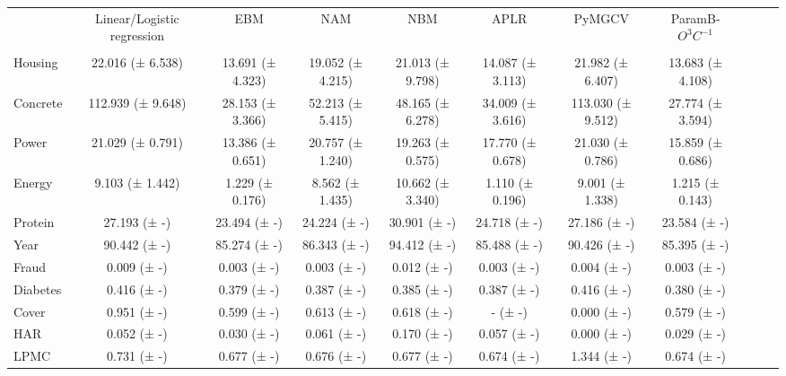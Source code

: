 \begin{tabular}{lcccccccccc}
\toprule
 & Linear/Logistic regression & EBM & NAM & NBM & APLR & PyMGCV & ParamB-$O^3C^{-1}$ \\
 &  &  &  &  &  &  &  \\
\midrule
Housing & 22.016 (± 6.538) & 13.691 (± 4.323) & 19.052 (± 4.215) & 21.013 (± 9.798) & 14.087 (± 3.113) & 21.982 (± 6.407) & 13.683 (± 4.108) \\
Concrete & 112.939 (± 9.648) & 28.153 (± 3.366) & 52.213 (± 5.415) & 48.165 (± 6.278) & 34.009 (± 3.616) & 113.030 (± 9.512) & 27.774 (± 3.594) \\
Power & 21.029 (± 0.791) & 13.386 (± 0.651) & 20.757 (± 1.240) & 19.263 (± 0.575) & 17.770 (± 0.678) & 21.030 (± 0.786) & 15.859 (± 0.686) \\
Energy & 9.103 (± 1.442) & 1.229 (± 0.176) & 8.562 (± 1.435) & 10.662 (± 3.340) & 1.110 (± 0.196) & 9.001 (± 1.338) & 1.215 (± 0.143) \\
Protein & 27.193 (± -) & 23.494 (± -) & 24.224 (± -) & 30.901 (± -) & 24.718 (± -) & 27.186 (± -) & 23.584 (± -) \\
Year & 90.442 (± -) & 85.274 (± -) & 86.343 (± -) & 94.412 (± -) & 85.488 (± -) & 90.426 (± -) & 85.395 (± -) \\
Fraud & 0.009 (± -) & 0.003 (± -) & 0.003 (± -) & 0.012 (± -) & 0.003 (± -) & 0.004 (± -) & 0.003 (± -) \\
Diabetes & 0.416 (± -) & 0.379 (± -) & 0.387 (± -) & 0.385 (± -) & 0.387 (± -) & 0.416 (± -) & 0.380 (± -) \\
Cover & 0.951 (± -) & 0.599 (± -) & 0.613 (± -) & 0.618 (± -) & - (± -) & 0.000 (± -) & 0.579 (± -) \\
HAR & 0.052 (± -) & 0.030 (± -) & 0.061 (± -) & 0.170 (± -) & 0.057 (± -) & 0.000 (± -) & 0.029 (± -) \\
LPMC & 0.731 (± -) & 0.677 (± -) & 0.676 (± -) & 0.677 (± -) & 0.674 (± -) & 1.344 (± -) & 0.674 (± -) \\
\bottomrule
\end{tabular}
